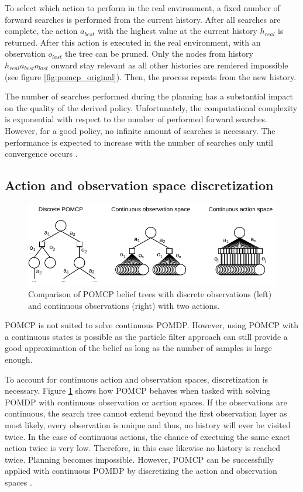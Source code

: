 To select which action to perform in the real environment, a fixed number of forward searches is performed from the current history. After all searches are complete, the action $a_{best}$ with the highest value at the current history $h_{real}$ is returned. After this action is executed in the real environment, with an observation $o_{last}$ the tree can be pruned. Only the nodes from history $h_{real}a_{best}o_{last}$ onward stay relevant as all other histories are rendered impossible (see figure \ref{fig:pomcp_original}). Then, the process repeats from the new history.

The number of searches performed during the planning has a substantial impact on the quality of the derived policy. Unfortunately, the computational complexity is exponential with respect to the number of performed forward searches. However, for a good policy, no infinite amount of searches is necessary. The performance is expected to increase with the number of searches only until convergence occurs \parencite{pomcp}.

\subsection{Action and observation space discretization}
\label{sec:discretization}

\begin{figure}[htbp]
    \centering
    \includegraphics[width=1.0\textwidth]{figures/pomcp_continuous.pdf}
    \caption[Comparison of POMCP belief trees with discrete observations and continuous observations]{Comparison of POMCP belief trees with discrete observations (left) and continuous observations (right) with two actions.}
    \label{fig:pomcp_cont}
\end{figure}

POMCP is not suited to solve continuous POMDP. However, using POMCP with a continuous states is possible as the particle filter approach can still provide a good approximation of the belief as long as the number of samples is large enough. 


To account for continuous action and observation spaces, discretization is necessary. Figure \ref{fig:pomcp_cont} shows how POMCP behaves when tasked with solving POMDP with continuous observation or acrtion spaces. If the observations are continuous, the search tree cannot extend beyond the first observation layer as most likely, every observation is unique and thus, no history will ever be visited twice. In the case of continuous actions, the chance of exectuing the same exact action twice is very low. Therefore, in this case likewise no history is reached twice. Planning becomes impossible. However, POMCP can be successfully applied with continuous POMDP by discretizing the action and observation spaces \parencite{pomcp_continuous}.

